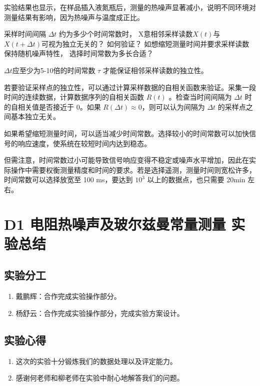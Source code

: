 \documentclass[dvipsnames, svgnames,a4paper,11pt]{article}
\begin{document}
	实验结果也显示，在样品插入液氮瓶后，测量的热噪声显著减小，说明不同环境对测量结果有影响，因为热噪声与温度成正比。






\begin{question}
	采样时间间隔 $\Delta t$ 约为多少个时间常数时， X意相邻采样读数$X(t)$与 $X(t + \Delta t)$可视为独立无关的？ 如何验证？ 如想缩短测量时间并要求采样读数保持随机噪声特性， 选择时间常数为多长合适？
\end{question}

	$\Delta t$应至少为5-10倍的时间常数 $\tau$ 才能保证相邻采样读数的独立性。

	若要验证采样点的独立性，可以通过计算采样数据的自相关函数来验证。采集一段时间的连续数据，计算数据序列的自相关函数 $R(t)$ 。检查当时间间隔为 $\Delta t$ 时的自相关值是否接近于 0。如果 $R(\Delta t) \approx 0$，则可以认为间隔为 $\Delta t$ 的采样点之间基本独立无关。

	如果希望缩短测量时间，可以适当减少时间常数。选择较小的时间常数可以加快信号的响应速度，使系统在较短时间内达到稳态。

	但需注意，时间常数过小可能导致信号响应变得不稳定或噪声水平增加，因此在实际操作中需要权衡测量精度和时间的要求。若是选择遥测，测量时间则宽松许多，时间常数可以选择放宽至 100 ms，要达到 $10^3$ 以上的数据点，也只需要 20min 左右。



\clearpage
\section{D1 \quad 电阻热噪声及玻尔兹曼常量测量 \quad\heiti 实验总结}

\subsection{实验分工}
	\begin{enumerate}
		\item 戴鹏辉：合作完成实验操作部分。
		\item 杨舒云：合作完成实验操作部分，完成实验方案设计。
	\end{enumerate}


\subsection{实验心得}
	\begin{enumerate}
		\item 这次的实验十分锻炼我们的数据处理以及评定能力。
		
		\item 感谢何老师和柳老师在实验中耐心地解答我们的问题。

	\end{enumerate}
\end{document}
